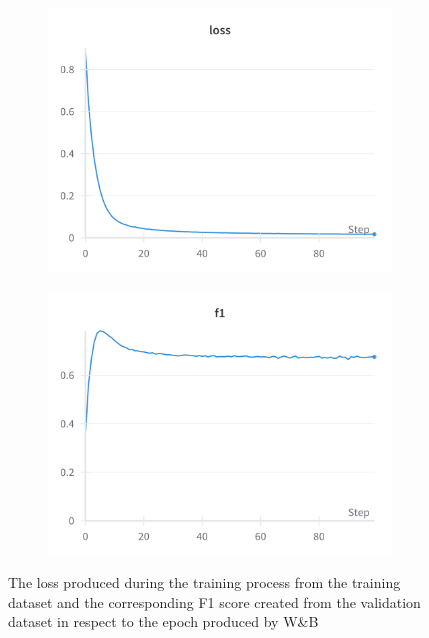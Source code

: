 \begin{figure}[!htb]
    \centering
    \begin{subfigure}[b]{0.49\textwidth}
        \centering
        \includegraphics[width=\textwidth]{./Images/loss.png}
    \end{subfigure}
    \begin{subfigure}[b]{0.49\textwidth}
        \centering
        \includegraphics[width=\textwidth]{./Images/f1.png}
    \end{subfigure}
    
    \caption{The loss produced during the training process from the training dataset and the corresponding F1 score created from the validation dataset in respect to the epoch produced by W\&B}
    \label{fig:loss}
\end{figure}

